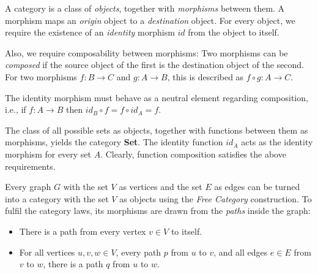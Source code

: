 \begin{definition}
    A category is a class of \textit{objects}, together with \textit{morphisms} between them.
    A morphism maps an \textit{origin} object to a \textit{destination} object.
    For every object, we require the existence of an \textit{identity} morphism $id$ from the object to itself.

    Also, we require composability between morphisms:
    Two morphisms can be \textit{composed} if the source object of the first is
    the destination object of the second.
    For two morphisms $f : B \rightarrow C$ and $g : A \rightarrow B$,
    this is described as $f \circ g : A \rightarrow C$.

    The identity morphism must behave as a neutral element regarding composition, i.e.,
    if $f : A \rightarrow B$ then $id_B \circ f = f \circ id_A = f$.
\end{definition}

\begin{example}
    The class of all possible sets as objects, together with functions between them as morphisms,
    yields the category \textbf{Set}.
    The identity function $id_A$ acts as the identity morphism for every set $A$.
    Clearly, function composition satisfies the above requirements.
\end{example}

\begin{example}
    Every graph $G$ with the set $V$ as vertices and the set $E$ as edges
    can be turned into a category with the set $V$ as objects
    using the \textit{Free Category} construction.
    To fulfil the category laws, its morphisms are drawn from
    the \textit{paths} inside the graph:

    \begin{itemize}
        \item There is a path from every vertex $v \in V$ to itself.
        \item For all vertices $u, v, w \in V$,
              every path $p$ from $u$ to $v$,
              and all edges $e \in E$ from $v$ to $w$,
              there is a path $q$ from $u$ to $w$.
    \end{itemize}
\end{example}

